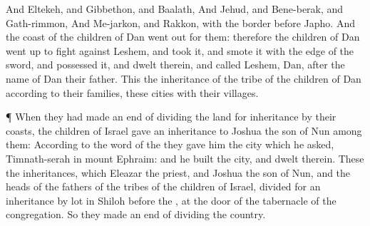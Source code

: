 {And
Eltekeh, and
Gibbethon, and
Baalath,
And
Jehud, and
Bene-berak, and
Gath-rimmon,
And
Me-jarkon, and
Rakkon, with the
border
before
Japho.
And the
coast of the
children of
Dan went
out
{} for them: therefore the
children of
Dan went
up to
fight against
Leshem, and
took it, and
smote it with the
edge of the
sword, and
possessed it, and
dwelt therein, and
called
Leshem,
Dan, after the
name of
Dan their
father.
This
{} the
inheritance of the
tribe of the
children of
Dan according to their
families, these
cities with their
villages.
\par }{\PP {}¶ When they had made an
end of dividing the
land for
inheritance by their
coasts, the
children of
Israel
gave an
inheritance to
Joshua the
son of
Nun
among them:
According to the
word of the
{} they
gave him the
city which he
asked,
{}
Timnath-serah in
mount
Ephraim: and he
built the
city, and
dwelt therein.
These
{} the
inheritances, which
Eleazar the
priest, and
Joshua the
son of
Nun, and the
heads of the
fathers of the
tribes of the
children of
Israel, divided for an
inheritance by
lot in
Shiloh
before the
{}, at the
door of the
tabernacle of the
congregation. So they made an
end of
dividing the
country.

}

